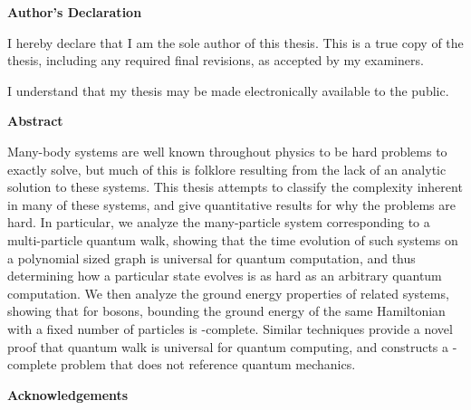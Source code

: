 \pagestyle{plain}
\setcounter{page}{2}

\cleardoublepage %

 



\begin{center}\textbf{Author's Declaration}\end{center}

  \noindent
I hereby declare that I am the sole author of this thesis. This is a true copy of the thesis, including any required final revisions, as accepted by my examiners.

  \bigskip
  
  \noindent
I understand that my thesis may be made electronically available to the public.

\cleardoublepage



\begin{center}\textbf{Abstract}\end{center}

Many-body systems are well known throughout physics to be hard problems to exactly solve, but much of this is folklore resulting from the lack of an analytic solution to these systems.  This thesis attempts to classify the complexity inherent in many of these systems, and give quantitative results for why the problems are hard.  In particular, we analyze the many-particle system corresponding to a multi-particle quantum walk, showing that the time evolution of such systems on a polynomial sized graph is universal for quantum computation, and thus determining how a particular state evolves is as hard as an arbitrary quantum computation.  We then analyze the ground energy properties of related systems, showing that for bosons, bounding the ground energy of the same Hamiltonian with a fixed number of particles is \QMA-complete.  Similar techniques provide a novel proof that quantum walk is universal for quantum computing, and constructs a \QMA-complete problem that does not reference quantum mechanics.  


\cleardoublepage


\begin{center}\textbf{Acknowledgements}\end{center}

